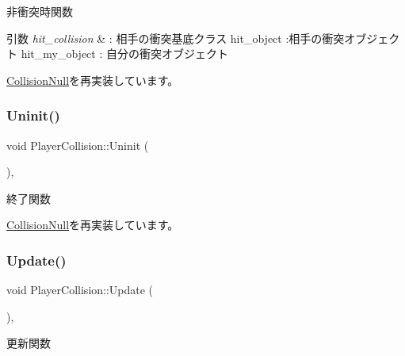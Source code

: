 非衝突時関数 


\begin{DoxyParams}{引数}
{\em hit\+\_\+collision} & \+: 相手の衝突基底クラス hit\+\_\+object \+:相手の衝突オブジェクト hit\+\_\+my\+\_\+object \+: 自分の衝突オブジェクト \\
\hline
\end{DoxyParams}


\mbox{\hyperlink{class_collision_null_aba2a574ab42dca618c41dd0b9562f614}{Collision\+Null}}を再実装しています。

\mbox{\label{class_player_collision_aa1ab60a62fa2ae3231a1ea0bc8faf801}} 
\subsubsection{\texorpdfstring{Uninit()}{Uninit()}}
{\footnotesize\ttfamily void Player\+Collision\+::\+Uninit (\begin{DoxyParamCaption}{ }\end{DoxyParamCaption})\hspace{0.3cm}{\ttfamily [override]}, {\ttfamily [virtual]}}



終了関数 



\mbox{\hyperlink{class_collision_null_a7c6d0ec502efc55e2f406415451152f5}{Collision\+Null}}を再実装しています。

\mbox{\label{class_player_collision_a09f97f220903f5724a3af6b97af3a336}} 
\subsubsection{\texorpdfstring{Update()}{Update()}}
{\footnotesize\ttfamily void Player\+Collision\+::\+Update (\begin{DoxyParamCaption}{ }\end{DoxyParamCaption})\hspace{0.3cm}{\ttfamily [override]}, {\ttfamily [virtual]}}



更新関数 



